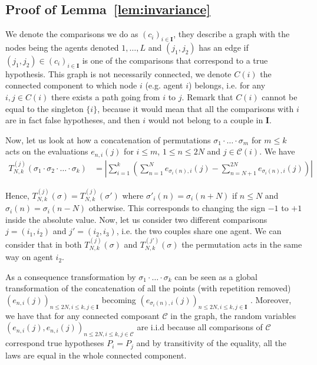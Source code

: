 \documentclass{article}
\theoremstyle{plain}
\theoremstyle{remark}
\newcommand{\1}{\mathbbm{1}}
\numberwithin{equation}{section}
\begin{document}
\subsection{Proof of Lemma~\ref{lem:invariance}}
We denote the comparisons we do as $(c_i)_{i \in \textbf{I}}$, they describe a graph with the nodes being the agents denoted $1,\dots,L$ and $(j_1,j_2)$ has an edge if $(j_1,j_2)\in(c_i)_{i \in \textbf{I}}$ is one of the comparisons that correspond to a true hypothesis. This graph is not necessarily connected, we denote $C(i)$ the connected component to which node $i$ (e.g. agent $i$) belongs, i.e. for any $i,j \in C(i)$ there exists a path going from $i$ to $j$. Remark that $C(i)$ cannot be equal to the singleton $\{i\}$, because it would mean that all the comparisons with $i$ are in fact false hypotheses, and then $i$ would not belong to a couple in $\textbf{I}$.

Now, let us look at how a concatenation of permutations $\sigma_1\cdot\ldots\cdot\sigma_m$ for $m\le k$ acts on the evaluations $e_{n,i}(j)$ for $i \le m$, $1\le n\le 2N$ and $j \in \mathcal{C}(i)$. We have
\begin{align*}
T_{N,k}^{(j)}(\sigma_1 \cdot  \sigma_2 \cdot  \ldots  \cdot  \sigma_k)&=  \left|\sum_{i=1}^k\left(\sum_{n=1}^{N} e_{\sigma_i(n),i}(j)-\sum_{n=N+1}^{2N} e_{\sigma_i(n),i}(j)\right)\right|
\end{align*}

Hence, $T_{N,k}^{(j)}(\sigma) = T_{N,k}^{(j)}(\sigma')$ where $\sigma'_i(n)=\sigma_i(n+N)$ if $n \le N$ and $\sigma_i(n) = \sigma_i(n-N)$ otherwise. This corresponds to changing the sign $-1$ to $+1$ inside the absolute value. Now, let us consider two different comparisons $j=(i_1,i_2)$ and $j'=(i_2,i_3)$, i.e. the two couples share one agent. We can consider that in both $T_{N,k}^{(j)}(\sigma)$ and $T_{N,k}^{(j')}(\sigma)$ the permutation acts in the same way on agent $i_2$.

As a consequence transformation by $\sigma_1\cdot\ldots\cdot\sigma_k$ can be seen as a global transformation of the concatenation of all the points (with repetition removed) $(e_{n,i}(j))_{n\le 2N, i\le k,j\in \textbf{I}}$ becoming $(e_{\sigma_i(n),i}(j))_{n\le 2N, i\le k,j\in \textbf{I}}$ . Moreover, we have that for any connected composant $\mathcal{C}$ in the graph, the random variables $(e_{n,i}(j), e_{n,i}(j))_{n\le 2N, i\le k,j\in \mathcal{C}}$ are i.i.d because all comparisons of $\mathcal{C}$ correspond true hypotheses $P_i = P_j$ and by transitivity of the equality, all the laws are equal in the whole connected component.
\end{document}
